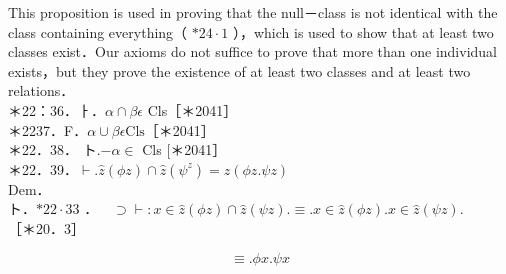 \documentclass[10pt]{article}
\begin{document}
This proposition is used in proving that the null－class is not identical with the class containing everything（ $* 24 \cdot 1$ ），which is used to show that at least two classes exist．Our axioms do not suffice to prove that more than one individual exists，but they prove the existence of at least two classes and at least two relations．\\
＊22：36．ㅏ．$\alpha \cap \beta \epsilon$ Cls［＊2041］\\
＊2237．F．$\alpha \cup \beta \epsilon \mathrm{Cls}$［＊2041］\\
＊22．38． ト.$-\alpha \in$ Cls $[$＊2041］\\
＊22．39．$\vdash . \hat{z}(\phi z) \cap \hat{z}\left(\psi^{z}\right)=\hat{z}(\phi z . \psi z)$\\
Dem．\\
ト．$* 22 \cdot 33$ ．$\quad \supset \vdash: x \in \hat{z}(\phi z) \cap \hat{z}(\psi z) . \equiv . x \in \hat{z}(\phi z) . x \in \hat{z}(\psi z)$.\\
［＊20．3］


\begin{equation*}
\equiv . \phi x . \psi x \tag{1}
\end{equation*}
\end{document}
